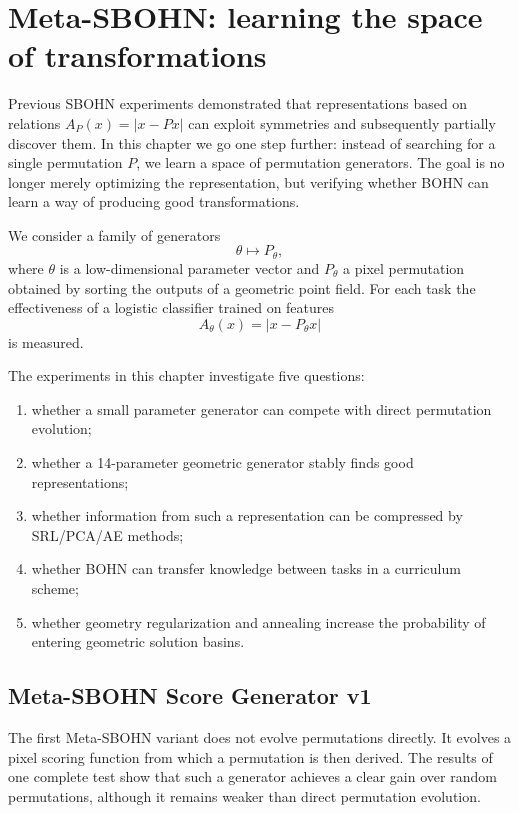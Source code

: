 \documentclass[11pt,a4paper]{report}
\begin{document}
\section{Meta-SBOHN: learning the space of transformations}
\label{sec:meta-sbohn}

Previous SBOHN experiments demonstrated that representations based on relations
\(A_P(x)=|x-Px|\) can exploit symmetries and subsequently partially discover them.
In this chapter we go one step further: instead of searching for a single permutation
\(P\), we learn a space of permutation generators. The goal is no longer merely
optimizing the representation, but verifying whether BOHN can learn a way of
producing good transformations.

We consider a family of generators
\[
  \theta \mapsto P_\theta,
\]
where \(\theta\) is a low-dimensional parameter vector and \(P_\theta\) a pixel
permutation obtained by sorting the outputs of a geometric point field. For each
task the effectiveness of a logistic classifier trained on features
\[
  A_\theta(x)=|x-P_\theta x|
\]
is measured.

The experiments in this chapter investigate five questions:
\begin{enumerate}[label=(\arabic*)]
  \item whether a small parameter generator can compete with direct permutation evolution;
  \item whether a 14-parameter geometric generator stably finds good representations;
  \item whether information from such a representation can be compressed by SRL/PCA/AE methods;
  \item whether BOHN can transfer knowledge between tasks in a curriculum scheme;
  \item whether geometry regularization and annealing increase the probability of entering geometric solution basins.
\end{enumerate}

\subsection{Meta-SBOHN Score Generator v1}

The first Meta-SBOHN variant does not evolve permutations directly. It evolves a pixel
scoring function from which a permutation is then derived. The results of one complete test
show that such a generator achieves a clear gain over random permutations, although
it remains weaker than direct permutation evolution.
\end{document}
